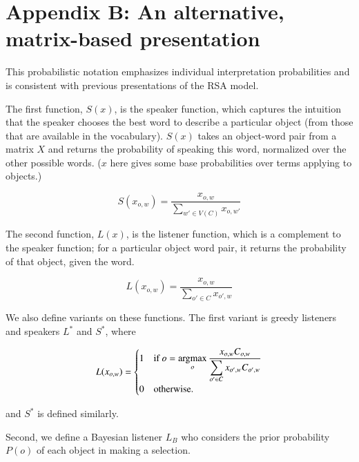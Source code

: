 \section{Appendix B: An alternative, matrix-based presentation}
\label{app:matrix}

This probabilistic notation emphasizes individual interpretation probabilities and is consistent with previous presentations of the RSA model.


The first function, $S(x)$, is the speaker function, which captures the intuition that the speaker chooses the best word to describe a particular object (from those that are available in the vocabulary). $S(x)$ takes an object-word pair from a matrix $X$ and returns the probability of speaking this word, normalized over the other possible words. ($x$ here gives some base probabilities over terms applying to objects.)

\begin{equation}
S(x_{o,w}) = \frac{x_{o,w}}{\displaystyle \sum_{w' \in V(C)} x_{o,w'}}
\end{equation}

The second function, $L(x)$, is the listener function, which is a complement to the speaker function; for a particular object word pair, it returns the probability of that object, given the word. 

\begin{equation}
L(x_{o,w}) = \frac{x_{o,w}}{\displaystyle\sum_{o' \in C} x_{o',w} } %
\end{equation}

We also define variants on these functions. The first variant is greedy listeners and speakers $L^*$ and $S^*$, where

\begin{equation}
L(x_{o,w}) = 
\begin{cases}
1 & \mbox{if } o = \displaystyle \argmax_{o} \frac{x_{o,w} C_{o,w}}{\displaystyle\sum_{o' \in C} x_{o',w} C_{o',w}} \\
0 & \mbox{otherwise}.
\end{cases}
\end{equation}

and $S^*$ is defined similarly. 

Second, we define a Bayesian listener $L_B$ who considers the prior probability $P(o)$ of each object in making a selection. 

